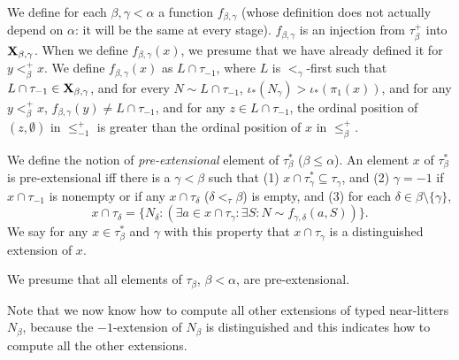 \documentclass[112pt]{article}
\begin{document}
\begin{description}
We define for each $\beta,\gamma <\alpha$ a function $f_{\beta,\gamma}$ (whose definition does not actually depend on $\alpha$:  it will be the same at every stage).  $f_{\beta,\gamma}$ is an injection from $\tau_\beta^+$ into ${\bf X}_{\beta,\gamma}$.
When we define $f_{\beta,\gamma}(x)$, we presume that we have already defined it for $y <^+_\beta x$.
We define $f_{\beta,\gamma}(x)$ as $L\cap \tau_{-1}$, where $L$ is $<_\gamma$-first such that $L\cap \tau_{-1} \in {\bf X}_{\beta,\gamma}$, and for every $N \sim L \cap \tau_{-1}$, $\iota_*(N_\gamma)>\iota_*(\pi_1(x))$, and for any $y<_\beta^+ x$, $f_{\beta,\gamma}(y) \neq L\cap \tau_{-1}$, and for any $z \in L\cap \tau_{-1}$, the ordinal position of
$(z,\emptyset)$ in $\leq^+_{-1}$ is greater than the ordinal position of $x$ in $\leq^+_\beta$.

\begin{comment}

Look at Sky's approach

\end{comment}



We define the notion of {\em pre-extensional\/} element of $\tau^*_\beta$ ($\beta \leq \alpha$).   An element $x$ of $\tau^*_\beta$ is pre-extensional iff there is a $\gamma<\beta$ such that (1) $x \cap \tau^*_\gamma \subseteq \tau_\gamma$, and (2) $\gamma=-1$ if
$x \cap \tau_{-1}$ is nonempty or if any $x \cap \tau_\delta$ ($\delta <_\tau \beta$) is empty,  and (3) for each $\delta \in \beta \setminus \{\gamma\}$, $$x \cap \tau_\delta= \{N_\delta:(\exists a \in x\cap \tau_\gamma:\exists S:N \sim f_{\gamma,\delta}(a,S))\}.$$  We say for any $x \in \tau^*_\beta$ and $\gamma$ with this property that $x \cap \tau_\gamma$ is a distinguished extension of $x$.

We presume that all elements of $\tau_\beta$, $\beta<\alpha$, are pre-extensional. 

 

Note that we now know how to compute all other extensions of typed near-litters $N_\beta$, because the $-1$-extension of $N_\beta$ is distinguished and this indicates how to compute all the other extensions.






\end{description}
\end{document}
